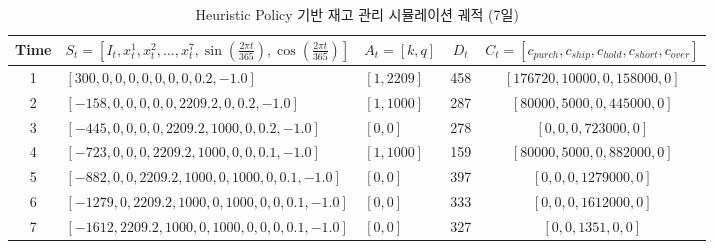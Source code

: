 \documentclass{article}
\begin{document}
\begin{table}[ht]
    \centering
    \small %
    \caption{Heuristic Policy 기반 재고 관리 시뮬레이션 궤적 (7일)}
    \label{tab:heuristic_trajectory}
    \begin{tabular}{cllcc}
        \toprule
        \textbf{Time} & $S_t = \left[ I_t, x_t^1, x_t^2, \dots, x_t^7, \sin \left( \frac{2\pi t}{365} \right), \cos \left( \frac{2\pi t}{365} \right) \right]$ & $A_t = [k, q]$ & $D_t$ & $C_t = [c_{purch}, c_{ship}, c_{hold}, c_{short}, c_{over}]$ \\
        \midrule
        1 & $[300, 0, 0, 0, 0, 0, 0, 0, 0.2, -1.0]$ & $[1, 2209]$ & 458 & $[176720, 10000, 0, 158000, 0]$ \\
        2 & $[-158, 0, 0, 0, 0, 0, 2209.2, 0, 0.2, -1.0]$ & $[1, 1000]$ & 287 & $[80000, 5000, 0, 445000, 0]$ \\
        3 & $[-445, 0, 0, 0, 0, 2209.2, 1000, 0, 0.2, -1.0]$ & $[0, 0]$ & 278 & $[0, 0, 0, 723000, 0]$ \\
        4 & $[-723, 0, 0, 0, 2209.2, 1000, 0, 0, 0.1, -1.0]$ & $[1, 1000]$ & 159 & $[80000, 5000, 0, 882000, 0]$ \\
        5 & $[-882, 0, 0, 2209.2, 1000, 0, 1000, 0, 0.1, -1.0]$ & $[0, 0]$ & 397 & $[0, 0, 0, 1279000, 0]$ \\
        6 & $[-1279, 0, 2209.2, 1000, 0, 1000, 0, 0, 0.1, -1.0]$ & $[0, 0]$ & 333 & $[0, 0, 0, 1612000, 0]$ \\
        7 & $[-1612, 2209.2, 1000, 0, 1000, 0, 0, 0, 0.1, -1.0]$ & $[0, 0]$ & 327 & $[0, 0, 1351, 0, 0]$ \\
        \bottomrule
    \end{tabular}
\end{table}
\end{document}
